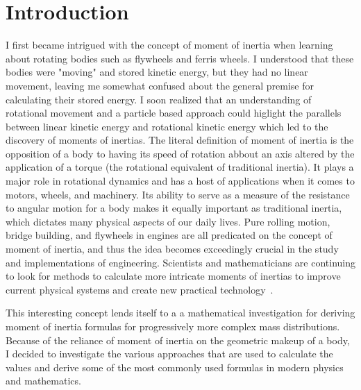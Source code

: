 \section{Introduction}
\label{sec:introduction}
I first became intrigued with the concept of moment of inertia when learning about rotating bodies such as flywheels and ferris wheels. I understood that these bodies were "moving" and stored kinetic energy, but they had no linear movement, leaving me somewhat confused about the general premise for calculating their stored energy. I soon realized that an understanding of rotational movement and a particle based approach could higlight the parallels between linear kinetic energy and rotational kinetic energy which led to the discovery of moments of inertias. The literal definition of moment of inertia is the opposition of a body to having its speed of rotation abbout an axis altered by the application of a torque (the rotational equivalent of traditional inertia). It plays a major role in rotational dynamics and has a host of applications when it comes to motors, wheels, and machinery. Its ability to serve as a measure of the resistance to angular motion for a body makes it equally important as traditional inertia, which dictates many physical aspects of our daily lives. Pure rolling motion, bridge building, and flywheels in engines are all predicated on the concept of moment of inertia, and thus the idea becomes exceedingly crucial in the study and implementations of engineering. Scientists and mathematicians are continuing to look for methods to calculate more intricate moments of inertias to improve current physical systems and create new practical technology~\parencite{Young_Freedman_Young_2020}.


This interesting concept lends itself to a a mathematical investigation for deriving moment of inertia formulas for progressively more complex mass distributions. Because of the reliance of moment of inertia on the geometric makeup of a body, I decided to investigate the various approaches that are used to calculate the values and derive some of the most commonly used formulas in modern physics and mathematics.